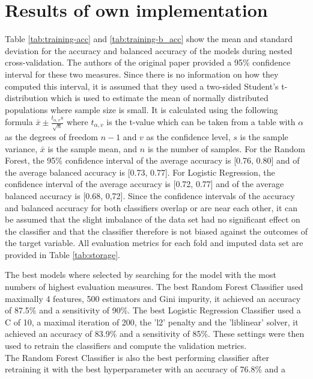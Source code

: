 \section{Results of own implementation}
Table \ref{tab:training-acc} and \ref{tab:training-b_acc} show the mean and 
standard deviation for the accuracy and balanced accuracy of the models during 
nested cross-validation. The authors of the original paper provided a 95\% 
confidence interval for these two measures. Since there is no information on 
how they computed this interval, it is assumed that they used a two-sided 
Student's t-distribution which is used to estimate the mean of normally 
distributed populations where sample size is small. It is calculated using the 
following formula $\bar{x} \pm \frac{t_{\alpha, v}s}{\sqrt{n}}$ where 
$t_{\alpha, v}$ is the t-value which can be taken from a table with $\alpha$ 
as the degrees of freedom $n-1$ and $v$ as the confidence level, $s$ is the 
sample variance, $\bar{x}$ is the sample mean, and $n$ is the number of samples.
For the Random Forest, the 95\% confidence interval of the average accuracy is 
[0.76, 0.80] and of the average balanced accuracy is [0.73, 0.77]. For Logistic 
Regression, the confidence interval of the average accuracy is [0.72, 0.77] and 
of the average balanced accuracy is [0.68, 0,72]. Since the confidence 
intervals of the accuracy and balanced accuracy for both classifiers overlap or 
are near each other, it can be assumed that the slight imbalance of the data 
set had no significant effect on the classifier and that the classifier 
therefore 
is not biased against the outcomes of the target variable. All evaluation 
metrics for each fold and imputed data set are provided in Table 
\ref{tab:storage}.
\par
The best models where selected by searching for the model with the most numbers 
of highest evaluation measures. The best Random Forest Classifier used 
maximally 
4 features, 500 estimators and Gini impurity, it achieved an accuracy of 87.5\% 
and a 
sensitivity of 90\%. The best Logistic Regression Classifier used a C of 10, a 
maximal iteration of 200, the 'l2' penalty and the 'liblinear' solver, it 
achieved an accuracy 
of 83.9\% and a sensitivity of 85\%. These settings were then used to retrain 
the classifiers and compute the validation metrics.
\\
The Random Forest Classifier is also the best performing classifier after 
retraining it with the best hyperparameter with an accuracy of 76.8\% and a 
